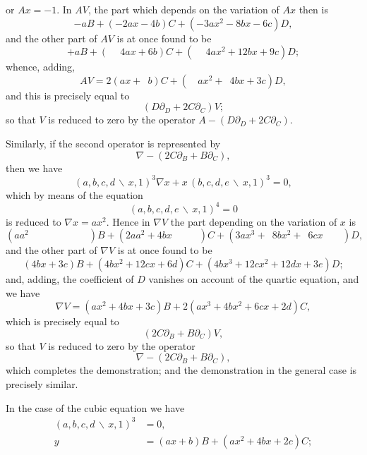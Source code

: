\documentclass[11pt,a4paper]{book}
\begin{document}
\newpage

or $Ax = -1$. In $AV$, the part which depends on the variation of $Ax$ then is
\[-aB + (-2ax-4b)C + (-3ax^{2}-8bx-6c)D,\]
and the other part of $AV$ is at once found to be
\[+aB + (\phantom{-}4ax+6b)C + (\phantom{-}4ax^{2}+12bx+9c)D;\]
whence, adding,
\[AV = 2(ax+\phantom{1}b)C + (\phantom{1\;\,}ax^{2}+\phantom{1}4bx+3c)D,\]
and this is precisely equal to
\[(D\partial_{D} + 2C\partial_{C})V;\]
so that $V$ is reduced to zero by the operator $A - (D\partial_{D} + 2C\partial_{C})$.

Similarly, if the second operator is represented by
\[\nabla - (2C\partial_{B} + B\partial_{C}),\]
then we have
\[(a,b,c,d\,\backslash\!\!\,x,1)^{3}\nabla x + x\,(b,c,d,e\,\backslash\!\!\,x,1)^{3} = 0,\]
which by means of the equation
\[(a,b,c,d,e\,\backslash\!\!\,x,1)^{4} = 0\]
is reduced to $\nabla x = ax^{2}$. Hence in $\nabla V$ the part depending on the variation
of $x$ is
\[(aa^{2}\phantom{+0000x+000})B + (2aa^{2}+4bx\phantom{+000\;\,})C + (3ax^{3}+\phantom{1}8bx^{2}+\phantom{1}6cx\phantom{+0d\,})D,\]
and the other part of $\nabla V$ is at once found to be
\[(4bx+3c)B + (4bx^{2}+12cx+6d)C + (4bx^{3}+12cx^{2}+12dx+3e)D;\]
and, adding, the coefficient of $D$ vanishes on account of the quartic equation, and we
have
\[\nabla V = (ax^{2}+4bx+3c)B + 2(ax^{3}+4bx^{2}+6cx+2d)C,\]
which is precisely equal to
\[(2C\partial_{B} + B\partial_{C})V,\]
so that $V$ is reduced to zero by the operator
\[\nabla - (2C\partial_{B} + B\partial_{C}),\]
which completes the demonstration; and the demonstration in the general case is
precisely similar.

In the case of the cubic equation we have
\begin{align*}
(a,b,c,d\,\backslash\!\!\,x,1)^{3} &= 0,\\
y &= (ax+b)B + (ax^{2}+4bx+2c)C;
\end{align*}
\vspace{0.5em}

\newpage
\end{document}
